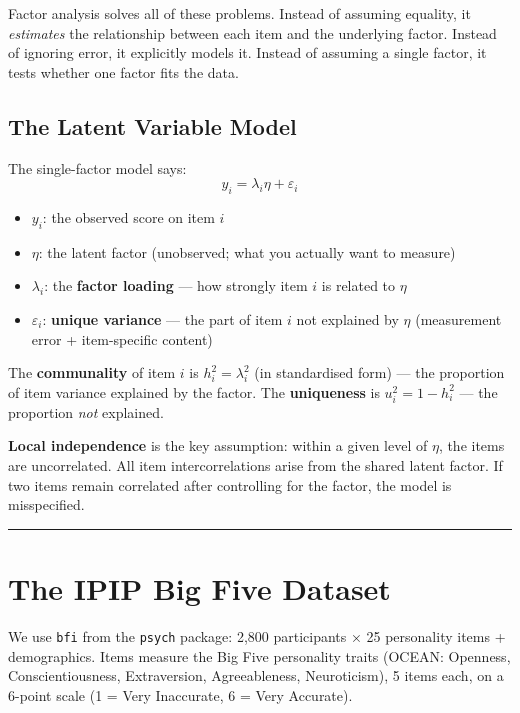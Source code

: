 \documentclass[
]{article}
\providecommand{\tightlist}{%
  \setlength{\itemsep}{0pt}\setlength{\parskip}{0pt}}
\begin{document}
Factor analysis solves all of these problems. Instead of assuming
equality, it \emph{estimates} the relationship between each item and the
underlying factor. Instead of ignoring error, it explicitly models it.
Instead of assuming a single factor, it tests whether one factor fits
the data.

\subsection{The Latent Variable Model}\label{the-latent-variable-model}

The single-factor model says: \[y_i = \lambda_i \eta + \varepsilon_i\]

\begin{itemize}
\tightlist
\item
  \(y_i\): the observed score on item \(i\)
\item
  \(\eta\): the latent factor (unobserved; what you actually want to
  measure)
\item
  \(\lambda_i\): the \textbf{factor loading} --- how strongly item \(i\)
  is related to \(\eta\)
\item
  \(\varepsilon_i\): \textbf{unique variance} --- the part of item \(i\)
  not explained by \(\eta\) (measurement error + item-specific content)
\end{itemize}

The \textbf{communality} of item \(i\) is \(h_i^2 = \lambda_i^2\) (in
standardised form) --- the proportion of item variance explained by the
factor. The \textbf{uniqueness} is \(u_i^2 = 1 - h_i^2\) --- the
proportion \emph{not} explained.

\textbf{Local independence} is the key assumption: within a given level
of \(\eta\), the items are uncorrelated. All item intercorrelations
arise from the shared latent factor. If two items remain correlated
after controlling for the factor, the model is misspecified.

\begin{center}\rule{0.5\linewidth}{0.5pt}\end{center}

\section{The IPIP Big Five Dataset}\label{the-ipip-big-five-dataset}

We use \texttt{bfi} from the \texttt{psych} package: 2,800 participants
× 25 personality items + demographics. Items measure the Big Five
personality traits (OCEAN: Openness, Conscientiousness, Extraversion,
Agreeableness, Neuroticism), 5 items each, on a 6-point scale (1 = Very
Inaccurate, 6 = Very Accurate).
\end{document}
